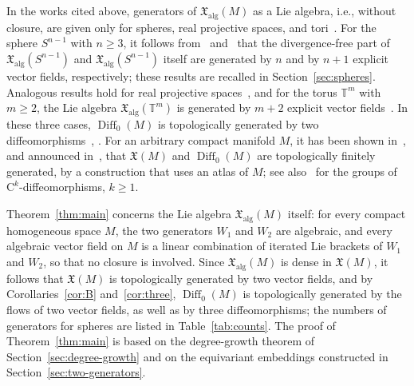 \documentclass{article}
\newcommand{\T}{\mathbb{T}}
\newcommand{\xalg}{\mathfrak X_{\mathrm{alg}}}
\theoremstyle{definition}
\theoremstyle{plain}
\begin{document}
 In the works cited above, generators of $\xalg(M)$ as a Lie algebra, i.e., without closure, are given only for spheres, real projective spaces, and tori~\cite{Luk74,Luk77,Luk79}.
For the sphere $S^{n-1}$ with $n\geq3$, it follows from~\cite[Theorem~3]{Luk74} and~\cite[Theorem~1 and Lemma~2]{Luk77} that the divergence-free part of $\xalg(S^{n-1})$ and $\xalg(S^{n-1})$ itself are generated by $n$ and by $n+1$ explicit vector fields, respectively; these results are recalled in Section~\ref{sec:spheres}.
Analogous results hold for real projective spaces~\cite[Theorem~1 and Lemma~3]{Luk77}, and for the torus $\T^m$ with $m\geq2$, the Lie algebra $\xalg(\T^m)$ is generated by $m+2$ explicit vector fields~\cite[Theorem~1]{Luk79}.
In these three cases, $\operatorname{Diff}_0(M)$ is topologically generated by two diffeomorphisms~\cite[Theorems~3 and~5]{Luk77}, \cite[Theorem~2]{Luk79}.
For an arbitrary compact manifold $M$, it has been shown in~\cite[Theorem~5]{Luk81}, and announced in~\cite[Theorem~4]{Luk78}, that $\mathfrak X(M)$ and $\operatorname{Diff}_0(M)$ are topologically finitely generated, by a construction that uses an atlas of $M$; see also~\cite[Theorem~1.4]{Akhmedov15} for the groups of $\mathrm{C}^k$-diffeomorphisms, $k\geq1$.

 Theorem~\ref{thm:main} concerns the Lie algebra $\xalg(M)$ itself: for every compact homogeneous space $M$, the two generators $W_1$ and $W_2$ are algebraic, and every algebraic vector field on $M$ is a linear combination of iterated Lie brackets of $W_1$ and $W_2$, so that no closure is involved.
Since $\xalg(M)$ is dense in $\mathfrak X(M)$, it follows that $\mathfrak X(M)$ is topologically generated by two vector fields, and by Corollaries~\ref{cor:B} and~\ref{cor:three}, $\operatorname{Diff}_0(M)$ is topologically generated by the flows of two vector fields, as well as by three diffeomorphisms; the numbers of generators for spheres are listed in Table~\ref{tab:counts}.
The proof of Theorem~\ref{thm:main} is based on the degree-growth theorem of Section~\ref{sec:degree-growth} and on the equivariant embeddings constructed in Section~\ref{sec:two-generators}.
\end{document}

